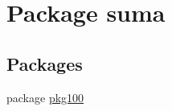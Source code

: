\hypertarget{namespacesuma}{}\section{Package suma}
\label{namespacesuma}
\subsection*{Packages}
\begin{DoxyCompactItemize}
\item 
package \mbox{\hyperlink{namespacesuma_1_1pkg100}{pkg100}}
\end{DoxyCompactItemize}
